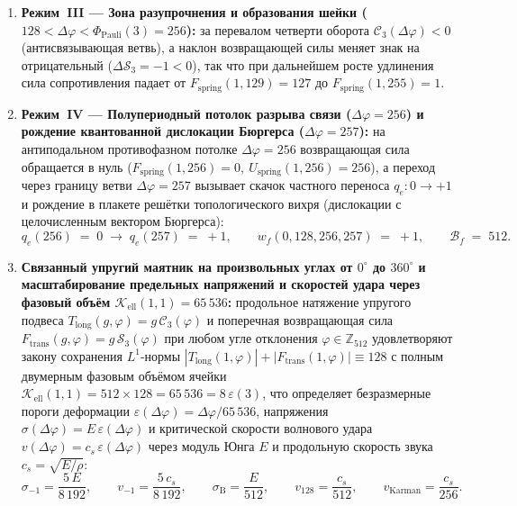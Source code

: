 \begin{theorem}
\begin{enumerate}[label=\textbf{(\arabic*)},leftmargin=*]
  \begin{equation}
    \label{eq:mono-uts-peak-128}
    F_{\mathrm{spring}}(1, 128) \;=\; Q_\square(3) \;=\; 128 \;\ge\; F_{\mathrm{spring}}(1, \varphi) \quad (\forall\,\varphi \in \mathbb{Z}_{512}), \qquad
    \mathcal{C}_3(128) \;=\; 0.
  \end{equation}
\item \textbf{Режим~III --- Зона разупрочнения и образования шейки ($128 < \Delta\varphi < \Phi_{\mathrm{Pauli}}(3) = 256$):}
  за перевалом четверти оборота $\mathcal{C}_3(\Delta\varphi) < 0$ (антисвязывающая ветвь), а наклон возвращающей силы меняет знак на отрицательный ($\Delta\mathcal{S}_3 = -1 < 0$), так что при дальнейшем росте удлинения сила сопротивления падает от $F_{\mathrm{spring}}(1, 129) = 127$ до $F_{\mathrm{spring}}(1, 255) = 1$.
\item \textbf{Режим~IV --- Полупериодный потолок разрыва связи ($\Delta\varphi = 256$) и рождение квантованной дислокации Бюргерса ($\Delta\varphi = 257$):}
  на антиподальном противофазном потолке $\Delta\varphi = 256$ возвращающая сила обращается в нуль ($F_{\mathrm{spring}}(1, 256) = 0,\ U_{\mathrm{spring}}(1, 256) = 256$), а переход через границу ветви $\Delta\varphi = 257$ вызывает скачок частного переноса $q_e : 0 \to +1$ и рождение в плакете решётки топологического вихря (дислокации с целочисленным вектором Бюргерса):
  \begin{equation}
    \label{eq:mono-burgers-dislocation-jump}
    q_e(256) \;=\; 0 \;\longrightarrow\; q_e(257) \;=\; +1, \qquad
    w_f(0, 128, 256, 257) \;=\; +1, \qquad
    \mathcal{B}_f \;=\; 512.
  \end{equation}
\item \textbf{Связанный упругий маятник на произвольных углах от $0^\circ$ до $360^\circ$ и масштабирование предельных напряжений и скоростей удара через фазовый объём $\mathcal{K}_{\mathrm{ell}}(1,1) = 65\,536$:}
  продольное натяжение упругого подвеса $T_{\mathrm{long}}(g, \varphi) = g\,\mathcal{C}_3(\varphi)$ и поперечная возвращающая сила $F_{\mathrm{trans}}(g, \varphi) = g\,\mathcal{S}_3(\varphi)$ при любом угле отклонения $\varphi \in \mathbb{Z}_{512}$ удовлетворяют закону сохранения $L^1$-нормы $|T_{\mathrm{long}}(1, \varphi)| + |F_{\mathrm{trans}}(1, \varphi)| \equiv 128$ с полным двумерным фазовым объёмом ячейки $\mathcal{K}_{\mathrm{ell}}(1, 1) = 512 \times 128 = 65\,536 = 8\,\varepsilon(3)$, что определяет безразмерные пороги деформации $\varepsilon(\Delta\varphi) = \Delta\varphi / 65\,536$, напряжения $\sigma(\Delta\varphi) = E\,\varepsilon(\Delta\varphi)$ и критической скорости волнового удара $v(\Delta\varphi) = c_s\,\varepsilon(\Delta\varphi)$ через модуль Юнга $E$ и продольную скорость звука $c_s = \sqrt{E/\rho}$:
  \begin{equation}
    \label{eq:mono-metal-velocity-scaling}
    \sigma_{-1} = \frac{5\,E}{8\,192}, \qquad
    v_{-1} = \frac{5\,c_s}{8\,192}, \qquad
    \sigma_{\mathrm{B}} = \frac{E}{512}, \qquad
    v_{128} = \frac{c_s}{512}, \qquad
    v_{\mathrm{Karman}} = \frac{c_s}{256}.
  \end{equation}
\end{enumerate}
\end{theorem}

